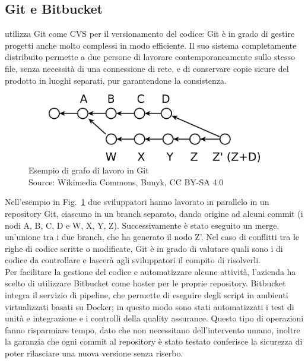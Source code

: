    \subsection{Git e Bitbucket}
   \nomeAzienda{} utilizza Git come \gls{CVS} per il versionamento del codice: Git è in grado di gestire progetti anche molto complessi in modo efficiente. Il suo sistema completamente distribuito permette a due persone di lavorare contemporaneamente sullo stesso file, senza necessità di una connessione di rete, e di conservare copie sicure del prodotto in luoghi separati, pur garantendone la consistenza.
   \begin{figure}[H]
      \begin{center}
         \includegraphics[width=15cm,height=3cm,keepaspectratio]{immagini/git-branches}
      \end{center}
      \caption[Esempio di grafo di lavoro in Git]{Esempio di grafo di lavoro in Git
      \\
      Source: Wikimedia Commons, Bunyk, CC BY-SA 4.0}\label{grafogit}
   \end{figure}
   Nell'esempio in Fig.~\ref{grafogit} due sviluppatori hanno lavorato in parallelo in un repository Git, ciascuno in un branch separato, dando origine ad alcuni commit (i nodi A, B, C, D e W, X, Y, Z). Successivamente è stato eseguito un merge, un'unione tra i due branch, che ha generato il nodo Z'. Nel caso di conflitti tra le righe di codice scritte o modificate, Git è in grado di valutare quali sono i  di codice da controllare e lascerà agli sviluppatori il compito di risolverli.
   \\
   Per facilitare la gestione del codice e automatizzare alcune attività, l'azienda ha scelto di utilizzare Bitbucket come hoster per le proprie repository. Bitbucket integra il servizio di pipeline, che permette di eseguire degli script in ambienti virtualizzati basati su Docker; in questo modo sono stati automatizzati i test di unità e integrazione e i controlli della quality assurance. Questo tipo di operazioni fanno risparmiare tempo, dato che non necessitano dell'intervento umano, inoltre la garanzia che ogni commit al repository è stato testato conferisce la sicurezza di poter rilasciare una nuova versione senza riserbo.
